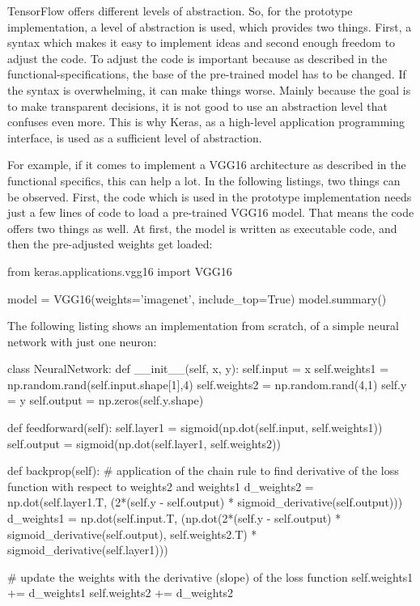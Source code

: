 TensorFlow offers different levels of abstraction. So, for the prototype implementation, a level of abstraction is used, which provides two things. First, a syntax which makes it easy to implement ideas and second enough freedom to adjust the code. To adjust the code is important because as described in the functional-specifications, the base of the pre-trained model has to be changed. If the syntax is overwhelming, it can make things worse. Mainly because the goal is to make transparent decisions, it is not good to use an abstraction level that confuses even more. This is why Keras, as a high-level application programming interface, is used as a sufficient level of abstraction. 

For example, if it comes to implement a VGG16 architecture as described in the functional specifics, this can help a lot. In the following listings, two things can be observed. First, the code which is used in the prototype implementation needs just a few lines of code to load a pre-trained VGG16 model. That means the code offers two things as well. At first, the model is written as executable code, and then the pre-adjusted weights get loaded:

\begin{python}[label={pred}, caption={Predictions of the pre-trained VGG16 Architecture CNN model}]
	from keras.applications.vgg16 import VGG16
	
	model = VGG16(weights='imagenet', include_top=True)
	model.summary()
\end{python}

The following listing shows an implementation from scratch, of a simple neural network with just one neuron:

\begin{python}[label={pred}, caption={Predictions of the pretrained VGG16 Architecture CNN model}]
	class NeuralNetwork:
	def __init__(self, x, y):
	self.input      = x
	self.weights1   = np.random.rand(self.input.shape[1],4) 
	self.weights2   = np.random.rand(4,1)                 
	self.y          = y
	self.output     = np.zeros(self.y.shape)
	
	def feedforward(self):
	self.layer1 = sigmoid(np.dot(self.input, self.weights1))
	self.output = sigmoid(np.dot(self.layer1, self.weights2))
	
	def backprop(self):
	# application of the chain rule to find derivative of the loss function with respect to weights2 and weights1
	d_weights2 = np.dot(self.layer1.T, (2*(self.y - self.output) * sigmoid_derivative(self.output)))
	d_weights1 = np.dot(self.input.T,  (np.dot(2*(self.y - self.output) * sigmoid_derivative(self.output), self.weights2.T) * sigmoid_derivative(self.layer1)))
	
	# update the weights with the derivative (slope) of the loss function
	self.weights1 += d_weights1
	self.weights2 += d_weights2
\end{python}

